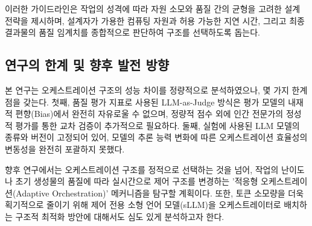 이러한 가이드라인은 작업의 성격에 따라 자원 소모와 품질 간의 균형을 고려한 설계 전략을 제시하며, 설계자가 가용한 컴퓨팅 자원과 허용 가능한 지연 시간, 그리고 최종 결과물의 품질 임계치를 종합적으로 판단하여 구조를 선택하도록 돕는다.

\subsection{연구의 한계 및 향후 발전 방향}

본 연구는 오케스트레이션 구조의 성능 차이를 정량적으로 분석하였으나, 몇 가지 한계점을 갖는다. 첫째, 품질 평가 지표로 사용된 LLM-as-Judge 방식은 평가 모델의 내재적 편향(Bias)에서 완전히 자유로울 수 없으며, 정량적 점수 외에 인간 전문가의 정성적 평가를 통한 교차 검증이 추가적으로 필요하다. 둘째, 실험에 사용된 LLM 모델의 종류와 버전이 고정되어 있어, 모델의 추론 능력 변화에 따른 오케스트레이션 효율성의 변동성을 완전히 포괄하지 못했다.

향후 연구에서는 오케스트레이션 구조를 정적으로 선택하는 것을 넘어, 작업의 난이도나 초기 생성물의 품질에 따라 실시간으로 제어 구조를 변경하는 '적응형 오케스트레이션(Adaptive Orchestration)' 메커니즘을 탐구할 계획이다. 또한, 토큰 소모량을 더욱 획기적으로 줄이기 위해 제어 전용 소형 언어 모델(sLLM)을 오케스트레이터로 배치하는 구조적 최적화 방안에 대해서도 심도 있게 분석하고자 한다.